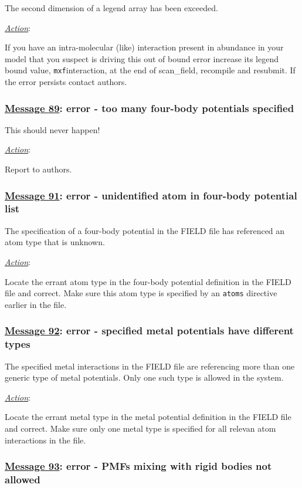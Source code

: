 The second dimension of a legend array has been exceeded.

\noindent \underline{\em Action}:

If you have an intra-molecular (like) interaction present in abundance
in your model that you suspect is driving this out of bound error
increase its legend bound value, {\tt mxf}interaction, at the end of
{\sc scan\_field}, recompile and resubmit.  If the error persists
contact authors.

\subsubsection*{\underline{Message 89}: error - too many four-body potentials specified}

This should never happen!

\noindent \underline{\em Action}:

Report to authors.

\subsubsection*{\underline{Message 91}: error - unidentified atom in four-body potential list}

The specification of a four-body
potential in the FIELD file has referenced an atom type that is
unknown.

\noindent \underline{\em Action}:

Locate the errant atom type in the four-body potential definition
in the FIELD file and correct.  Make sure this atom type is
specified by an {\tt atoms} directive earlier in the file.

\subsubsection*{\underline{Message 92}: error - specified metal potentials have different types}

The specified metal interactions in the
FIELD file are referencing more than one generic type of metal
potentials.  Only one such type is allowed in the system.

\noindent \underline{\em Action}:

Locate the errant metal type in the metal potential definition
in the FIELD file and correct.  Make sure only one metal type is
specified for all relevan atom interactions in the file.

\subsubsection*{\underline{Message 93}: error - PMFs mixing with rigid bodies not allowed}


